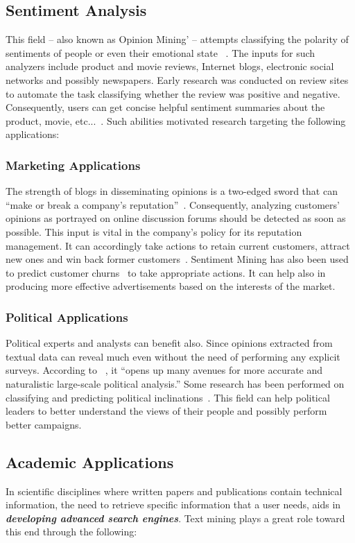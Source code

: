 \documentclass[a4,12pt]{report}
\begin{document}
\subsection{Sentiment Analysis} 
	This field -- also known as Opinion Mining' -- attempts classifying the polarity of sentiments of people 
	or even their emotional state ~\cite{Pang:08}. The inputs for such analyzers include product and movie reviews, 
	Internet blogs, electronic social networks and possibly newspapers. Early research was conducted on review sites
	to automate the task classifying whether the review was positive and negative. Consequently, users can get concise helpful
	sentiment summaries about the product, movie, etc...~\cite{Pang:02, Turney:02}. Such abilities motivated research targeting 
	the following applications:
	\subsubsection{Marketing Applications} 
		The strength of blogs in disseminating opinions is a two-edged sword that can 
		``make or break a company's reputation''~\cite{hoffman:08a}. Consequently, analyzing customers' opinions as portrayed 
		on online discussion forums should be detected as soon as possible. This input is vital in the company's policy for its
		reputation management. It can accordingly take actions to retain current customers, attract new ones and win back former 
		customers~\cite{hoffman:08b}. Sentiment Mining has also been used to predict customer churns~\cite{marketing:07,marketing:08}
		to take appropriate actions. It can help also in producing more effective advertisements based on the interests of the market.
	\subsubsection{Political Applications} 
		Political experts and analysts can benefit also. Since opinions extracted from textual data 
		can reveal much even without the need of performing any explicit surveys. According to ~\cite{Gryc:10}, it ``opens up many avenues
		for more accurate and naturalistic large-scale political analysis.'' Some research has been performed on classifying and predicting
		political inclinations~\cite{Durant:07, Yu:08}. This field can help political leaders to better understand the views of their people 
		and possibly perform better campaigns.
		
\subsection{Academic Applications} 
	In scientific disciplines where written papers and publications contain technical information, the need to retrieve
	specific information that a user needs, aids in \textbf{\em developing advanced search engines}. 
	Text mining plays a great role toward this end through the following:
\end{document}
